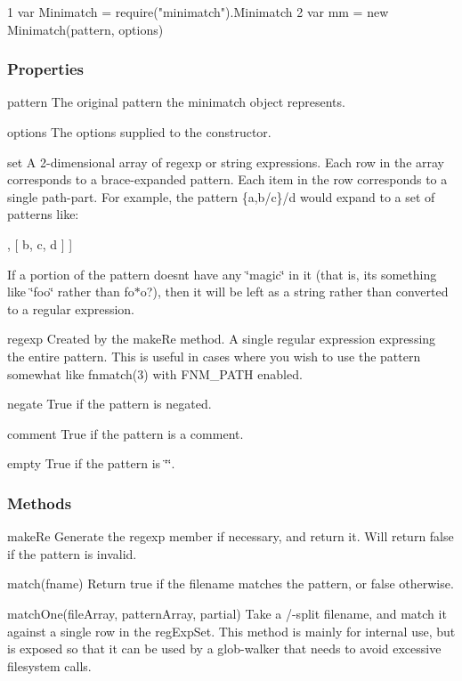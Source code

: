 \begin{DoxyCode}
1 var Minimatch = require("minimatch").Minimatch
2 var mm = new Minimatch(pattern, options)
\end{DoxyCode}


\subsubsection*{Properties}


\begin{DoxyItemize}
\item {\ttfamily pattern} The original pattern the minimatch object represents.
\item {\ttfamily options} The options supplied to the constructor.
\item {\ttfamily set} A 2-\/dimensional array of regexp or string expressions. Each row in the array corresponds to a brace-\/expanded pattern. Each item in the row corresponds to a single path-\/part. For example, the pattern {\ttfamily \{a,b/c\}/d} would expand to a set of patterns like\+: \begin{DoxyVerb}  [ [ a, d ]
  , [ b, c, d ] ]
\end{DoxyVerb}


If a portion of the pattern doesn\textquotesingle{}t have any \char`\"{}magic\char`\"{} in it (that is, it\textquotesingle{}s something like {\ttfamily \char`\"{}foo\char`\"{}} rather than {\ttfamily fo$\ast$o?}), then it will be left as a string rather than converted to a regular expression.
\item {\ttfamily regexp} Created by the {\ttfamily make\+Re} method. A single regular expression expressing the entire pattern. This is useful in cases where you wish to use the pattern somewhat like {\ttfamily fnmatch(3)} with {\ttfamily F\+N\+M\+\_\+\+P\+A\+T\+H} enabled.
\item {\ttfamily negate} True if the pattern is negated.
\item {\ttfamily comment} True if the pattern is a comment.
\item {\ttfamily empty} True if the pattern is {\ttfamily \char`\"{}\char`\"{}}.
\end{DoxyItemize}

\subsubsection*{Methods}


\begin{DoxyItemize}
\item {\ttfamily make\+Re} Generate the {\ttfamily regexp} member if necessary, and return it. Will return {\ttfamily false} if the pattern is invalid.
\item {\ttfamily match(fname)} Return true if the filename matches the pattern, or false otherwise.
\item {\ttfamily match\+One(file\+Array, pattern\+Array, partial)} Take a {\ttfamily /}-\/split filename, and match it against a single row in the {\ttfamily reg\+Exp\+Set}. This method is mainly for internal use, but is exposed so that it can be used by a glob-\/walker that needs to avoid excessive filesystem calls.
\end{DoxyItemize}

